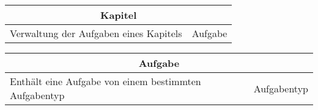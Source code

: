 \documentclass[11pt]{article}
\begin{document}
\begin{table}[h]
\begin{tabularx}{\textwidth}{|X|X|}
\hline
\multicolumn{2}{|c|}{Kapitel}\\ \hline
Verwaltung der Aufgaben eines Kapitels&Aufgabe   \\  \hline
\end{tabularx}

\end{table}

\begin{table}[h]
\begin{tabularx}{\textwidth}{|X|X|}
\hline
\multicolumn{2}{|c|}{Aufgabe}\\ \hline
Enthält eine Aufgabe von einem bestimmten Aufgabentyp&Aufgabentyp   \\  \hline
\end{tabularx}

\end{table}
\end{document}
